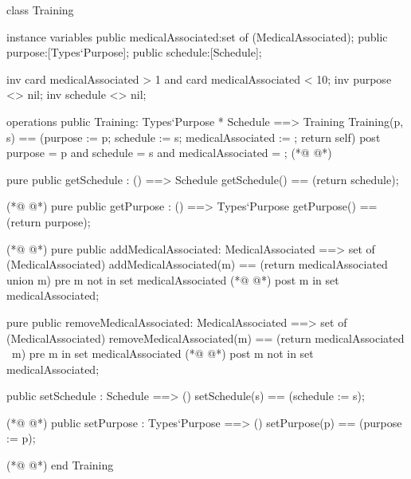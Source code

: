 \begin{vdmpp}[breaklines=true]
class Training
 
instance variables
 public medicalAssociated:set of (MedicalAssociated);
 public purpose:[Types`Purpose];
 public schedule:[Schedule];

 inv card medicalAssociated > 1 and card medicalAssociated < 10;
 inv purpose <> nil;
 inv schedule <> nil;

operations
 public Training: Types`Purpose * Schedule ==> Training
   Training(p, s) == (purpose := p; schedule := s; medicalAssociated := {}; return self)
 post purpose = p and schedule = s and medicalAssociated = {};
(*@
\label{Training:16}
@*)

 pure public getSchedule : () ==> Schedule
   getSchedule() == (return schedule);
 
(*@
\label{getSchedule:20}
@*)
  pure public getPurpose : () ==> Types`Purpose
  getPurpose() == (return purpose); 
  
(*@
\label{getPurpose:23}
@*)
  pure public addMedicalAssociated: MedicalAssociated ==> set of (MedicalAssociated)
   addMedicalAssociated(m) == (return medicalAssociated union {m})
  pre m not in set medicalAssociated
(*@
\label{addMedicalAssociated:26}
@*)
 post m in set medicalAssociated;
   
  pure public removeMedicalAssociated: MedicalAssociated ==> set of (MedicalAssociated)
   removeMedicalAssociated(m) == (return medicalAssociated \ {m})
  pre m in set medicalAssociated
(*@
\label{removeMedicalAssociated:31}
@*)
  post m not in set medicalAssociated;

 public setSchedule : Schedule ==> ()
   setSchedule(s) == (schedule := s);
 
(*@
\label{setSchedule:36}
@*)
 public setPurpose : Types`Purpose ==> ()
   setPurpose(p) == (purpose := p);
 
(*@
\label{setPurpose:39}
@*)
 end Training
\end{vdmpp}
